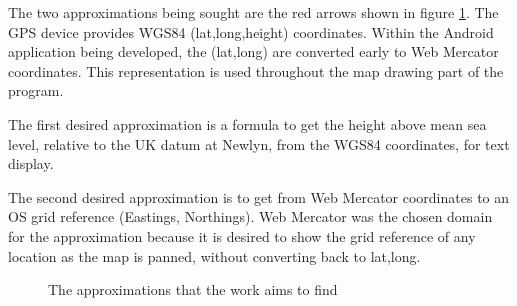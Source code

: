 \documentclass[10pt,a4paper]{article}
\begin{document}
The two approximations being sought are the red arrows shown in figure
\ref{fig:aims}.  The GPS device provides WGS84 (lat,long,height) coordinates.
Within the Android application being developed, the (lat,long) are converted
early to Web Mercator coordinates.  This representation is used throughout the
map drawing part of the program.

The first desired approximation is a formula to get the height above mean sea
level, relative to the UK datum at Newlyn, from the WGS84 coordinates, for text
display.

The second desired approximation is to get from Web Mercator coordinates to an
OS grid reference (Eastings, Northings).  Web Mercator was the chosen domain
for the approximation because it is desired to show the grid reference of any
location as the map is panned, without converting back to lat,long.

\begin{figure}[htbp]
  \hrulefill

  \centering
{}
\caption{The approximations that the work aims to find}
\label{fig:aims}

  \hrulefill
\end{figure}
\end{document}
